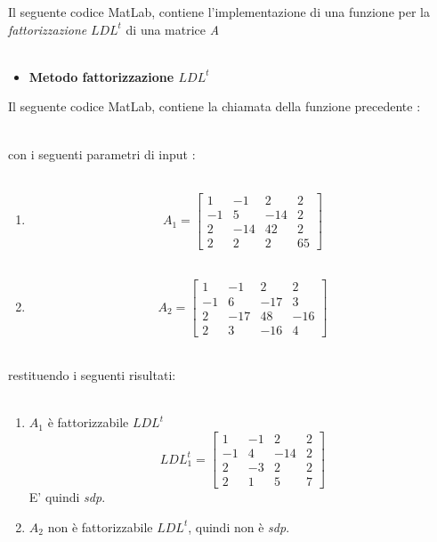 Il seguente codice MatLab, contiene l'implementazione di una funzione per la \textit{fattorizzazione} $LDL^t$ di una matrice \textit{A}\\\
\begin{itemize}
	\item \textbf{Metodo fattorizzazione $LDL^t$}
		
\end{itemize}
Il seguente codice MatLab, contiene la chiamata della funzione precedente :\\\
	
con i seguenti parametri di input :\\\
\begin{enumerate}
	\item
		\[
		A_1 =\begin{bmatrix}
			1  & -1  & 2   & 2  \\ 
			-1 & 5   & -14 & 2  \\
			2  & -14 & 42  & 2  \\
			2  & 2   & 2   & 65 
		\end{bmatrix}
		\]\\
	\item
		\[
		A_2 =\begin{bmatrix}
			1  & -1  & 2   & 2   \\ 
			-1 & 6   & -17 & 3   \\
			2  & -17 & 48  & -16 \\
			2  & 3   & -16 & 4   
		\end{bmatrix}
		\]\\
\end{enumerate}
restituendo i seguenti risultati:\\\
\begin{enumerate}
	\item
		$A_1$ è fattorizzabile $LDL^t$\\
		\[
		LDL^t_1 =\begin{bmatrix}
			1  & -1  & 2   & 2  \\ 
			-1 & 4   & -14 & 2  \\
			2  & -3  & 2   & 2  \\
			2  & 1   & 5   & 7 
		\end{bmatrix}
		\]
		E' quindi \textit{sdp}.\\
	\item
		$A_2$ non è fattorizzabile $LDL^t$, quindi non è \textit{sdp}.
\end{enumerate}